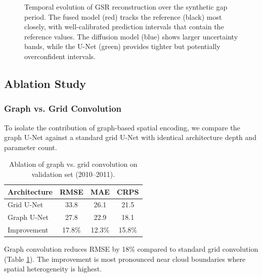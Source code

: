 \documentclass[preprint,12pt]{elsarticle}
\begin{document}
\begin{figure}[htbp]
\centering
{}
\caption{Temporal evolution of GSR reconstruction over the synthetic gap period. The fused model (red) tracks the reference (black) most closely, with well-calibrated prediction intervals that contain the reference values. The diffusion model (blue) shows larger uncertainty bands, while the U-Net (green) provides tighter but potentially overconfident intervals.}
\label{fig:timeseries}
\end{figure}

\subsection{Ablation Study}

\subsubsection{Graph vs. Grid Convolution}

To isolate the contribution of graph-based spatial encoding, we compare the graph U-Net against a standard grid U-Net with identical architecture depth and parameter count.

\begin{table}[htbp]
\centering
\caption{Ablation of graph vs. grid convolution on validation set (2010--2011).}
\label{tab:ablation_graph}
\begin{tabular}{lccc}
\toprule
Architecture & RMSE & MAE & CRPS \\
\midrule
Grid U-Net & 33.8 & 26.1 & 21.5 \\
Graph U-Net & 27.8 & 22.9 & 18.1 \\
\midrule
Improvement & 17.8\% & 12.3\% & 15.8\% \\
\bottomrule
\end{tabular}
\end{table}

Graph convolution reduces RMSE by 18\% compared to standard grid convolution (Table \ref{tab:ablation_graph}). The improvement is most pronounced near cloud boundaries where spatial heterogeneity is highest.
\end{document}
